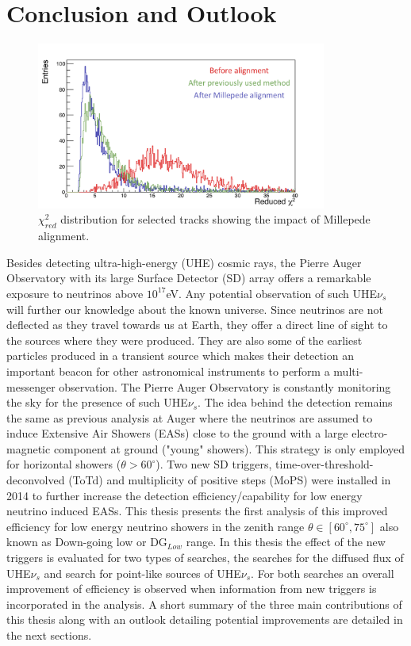 
\chapter{Conclusion and Outlook}
\label{chap:conc}
\begin{figure}[h!]
\centering
\includegraphics[width=0.85\textwidth]{thesis_figures/chi2_comp_conclusion_2.png}
\caption{$\chi^2_{red}$ distribution for selected tracks showing the impact of Millepede alignment.}
\label{fig:red_chi2_4}
\end{figure}

Besides detecting ultra-high-energy (UHE) cosmic rays, the Pierre Auger Observatory with its large Surface Detector (SD) array offers a remarkable exposure to neutrinos above $10^{17}$eV. Any potential observation of such UHE$\nu_s$ will further our knowledge about the known universe. Since neutrinos are not deflected as they travel towards us at Earth, they offer a direct line of sight to the sources where they were produced. They are also some of the earliest particles produced in a transient source which makes their detection an important beacon for other astronomical instruments to perform a multi-messenger observation. The Pierre Auger Observatory is constantly monitoring the sky for the presence of such UHE$\nu_s$. The idea behind the detection remains the same as previous analysis at Auger where the neutrinos are assumed to induce Extensive Air Showers (EASs) close to the ground with a large electro-magnetic component at ground ("young" showers). This strategy is only employed for horizontal showers ($\theta > 60^{\circ}$). Two new SD triggers, time-over-threshold-deconvolved (ToTd) and multiplicity of positive steps (MoPS) were installed in 2014 to further increase the detection efficiency/capability for low energy neutrino induced EASs. This thesis presents the first analysis of this improved efficiency for low energy neutrino showers in the zenith range $\theta \in [60^{\circ},75^\circ]$ also known as Down-going low or DG$_{Low}$ range. In this thesis the effect of the new triggers is evaluated for two types of searches, the searches for the diffused flux of UHE$\nu_s$ and search for point-like sources of UHE$\nu_s$. For both searches an overall improvement of efficiency is observed when information from new triggers is incorporated in the analysis. A short summary of the three main contributions of this thesis along with an outlook detailing potential improvements are detailed in the next sections. 
